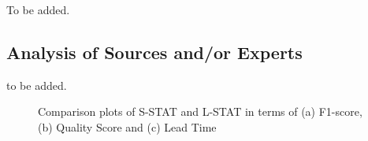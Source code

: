 \documentclass[conference]{IEEEtran}
\begin{document}
To be added.

\subsection{Analysis of Sources and/or Experts}

to be added.

\begin{figure}[ht]
\begin{center}
\end{center}
\caption{Comparison plots of S-STAT and L-STAT in terms of (a)
F1-score,(b) Quality Score and (c) Lead Time}
\label{fig:evaluation_metric}
\end{figure}
\end{document}
